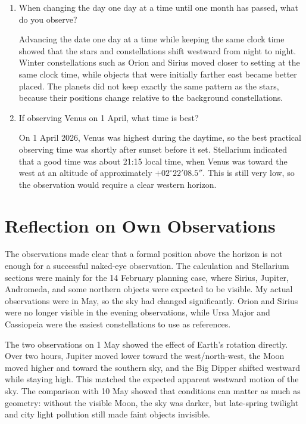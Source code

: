 \documentclass[a4paper,11pt]{article}
\begin{document}
\begin{enumerate}[label=\textbf{\arabic*.}, leftmargin=*]
    \item When changing the day one day at a time until one month has passed, what do you observe?

    Advancing the date one day at a time while keeping the same clock time showed that the stars and constellations shift westward from night to night. Winter constellations such as Orion and Sirius moved closer to setting at the same clock time, while objects that were initially farther east became better placed. The planets did not keep exactly the same pattern as the stars, because their positions change relative to the background constellations.

    \item If observing Venus on 1 April, what time is best?

    On 1 April 2026, Venus was highest during the daytime, so the best practical observing time was shortly after sunset before it set. Stellarium indicated that a good time was about 21:15 local time, when Venus was toward the west at an altitude of approximately $+02^\circ 22'08.5''$. This is still very low, so the observation would require a clear western horizon.
\end{enumerate}

\section{Reflection on Own Observations}
\label{sec:reflection}

The observations made clear that a formal position above the horizon is not enough for a successful naked-eye observation. The calculation and Stellarium sections were mainly for the 14 February planning case, where Sirius, Jupiter, Andromeda, and some northern objects were expected to be visible. My actual observations were in May, so the sky had changed significantly. Orion and Sirius were no longer visible in the evening observations, while Ursa Major and Cassiopeia were the easiest constellations to use as references.

The two observations on 1 May showed the effect of Earth's rotation directly. Over two hours, Jupiter moved lower toward the west/north-west, the Moon moved higher and toward the southern sky, and the Big Dipper shifted westward while staying high. This matched the expected apparent westward motion of the sky. The comparison with 10 May showed that conditions can matter as much as geometry: without the visible Moon, the sky was darker, but late-spring twilight and city light pollution still made faint objects invisible.
\end{document}
